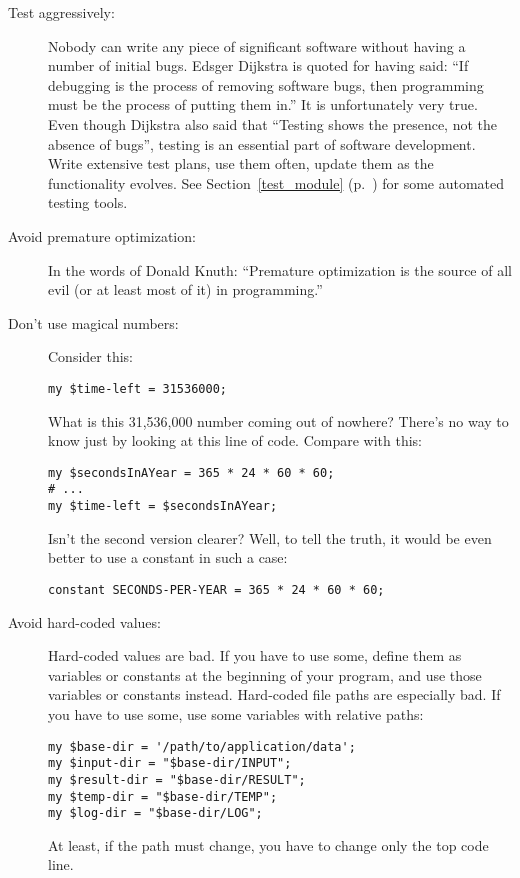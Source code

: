\begin{description}
\item[Test aggressively:] Nobody can write any piece of 
significant software without having a number of initial 
bugs. Edsger Dijkstra is quoted for having said: ``If 
debugging is the process of removing software bugs,
then programming must be the process of putting them in.'' 
It is unfortunately very true. Even though Dijkstra 
also said that ``Testing shows the presence, not the absence 
of bugs'', testing is an essential part of software 
development. Write extensive test plans, use them often,
update them as the functionality evolves. See Section~\ref{test_module} 
(p.~\pageref{test_module}) for some automated testing tools.

\item[Avoid premature optimization:] In the words of Donald 
Knuth: ``Premature optimization is the source of all evil (or 
at least most of it) in programming.''

\item[Don't use magical numbers:] Consider this:
\begin{verbatim}
my $time-left = 31536000;
\end{verbatim}

What is this 31,536,000 number coming out of nowhere? 
There's no way to know just by looking at this line 
of code. Compare with this:

\begin{verbatim}
my $secondsInAYear = 365 * 24 * 60 * 60;
# ...
my $time-left = $secondsInAYear;
\end{verbatim}

Isn't the second version clearer? Well, to tell the 
truth, it would be even better to use a constant in 
such a case:
\begin{verbatim}
constant SECONDS-PER-YEAR = 365 * 24 * 60 * 60;
\end{verbatim}

\item[Avoid hard-coded values:] Hard-coded values are bad.
If you have to use some, define them as variables or constants 
at the beginning of your program, and use those variables or 
constants instead. Hard-coded file paths are especially bad. If you 
have to use some, use some variables with relative paths:
\begin{verbatim}
my $base-dir = '/path/to/application/data';
my $input-dir = "$base-dir/INPUT";
my $result-dir = "$base-dir/RESULT";
my $temp-dir = "$base-dir/TEMP";
my $log-dir = "$base-dir/LOG";
\end{verbatim}
At least, if the path must change, you have to change only 
the top code line.


\end{description}
